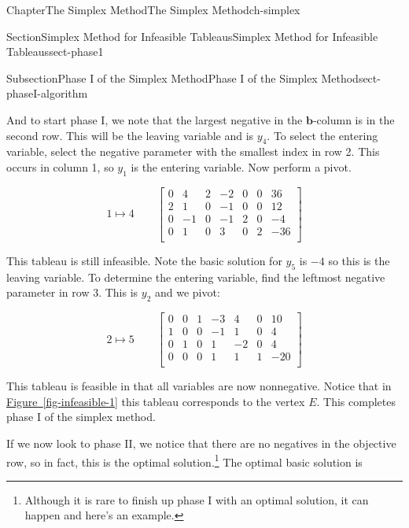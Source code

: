 \documentclass[oneside,10pt,]{book}
\newcommand{\xreffont}{\relax}
\numberwithin{equation}{section}
\newcommand{\amp}{&}
\begin{document}
\begin{chapterptx}{Chapter}{The Simplex Method}{}{The Simplex Method}{}{}{ch-simplex}
\begin{sectionptx}{Section}{Simplex Method for Infeasible Tableaus}{}{Simplex Method for Infeasible Tableaus}{}{}{sect-phase1}
\begin{subsectionptx}{Subsection}{Phase I of the Simplex Method}{}{Phase I of the Simplex Method}{}{}{sect-phaseI-algorithm}
\begin{equation*}
\end{equation*}
%
\par
And to start phase I, we note that the largest negative in the \(\boldsymbol{b}\)-column is in the second row. This will be the leaving variable and is \(y_4\). To select the entering variable, select the negative parameter with the smallest index in row 2. This occurs in column 1, so \(y_1\) is the entering variable. Now perform a pivot.%
\par
%
\begin{equation*}
1 \mapsto 4 \qquad \left[\begin{array}{rr|rrrr|r}
0 \amp 4 \amp 2 \amp -2 \amp 0 \amp 0 \amp 36\\
2 \amp 1 \amp 0 \amp -1 \amp 0 \amp 0 \amp 12\\
0 \amp -1 \amp 0 \amp -1 \amp 2 \amp 0 \amp -4\\ \hline
0 \amp 1 \amp 0 \amp 3 \amp 0 \amp 2 \amp -36\\
\end{array} \right]
\end{equation*}
%
\par
This tableau is still infeasible. Note the basic solution for \(y_5\) is \(-4\) so this is the leaving variable. To determine the entering variable, find the leftmost negative parameter in row 3. This is \(y_2\) and we pivot:%
\par
%
\begin{equation*}
2 \mapsto 5 \qquad \left[\begin{array}{rr|rrrr|r}
0 \amp 0 \amp 1 \amp -3 \amp 4 \amp 0 \amp 10\\
1 \amp 0 \amp 0 \amp -1 \amp 1 \amp 0 \amp 4\\
0 \amp 1 \amp 0 \amp 1 \amp -2 \amp 0 \amp 4\\ \hline
0 \amp 0 \amp 0 \amp 1 \amp 1 \amp 1 \amp -20\\
\end{array} \right]
\end{equation*}
%
\par
This tableau is feasible in that all variables are now nonnegative. Notice that in \hyperref[fig-infeasible-1]{Figure~{\xreffont\ref{fig-infeasible-1}}} this tableau corresponds to the vertex \(E\). This completes phase I of the simplex method.%
\par
If we now look to phase II, we notice that there are no negatives in the objective row, so in fact, this is the optimal solution.\footnote{Although it is rare to finish up phase I with an optimal solution, it can happen and here's an example.\label{sect-phaseI-algorithm-11-1}} The optimal basic solution is%

\end{subsectionptx}
\end{sectionptx}
\end{chapterptx}
\end{document}
